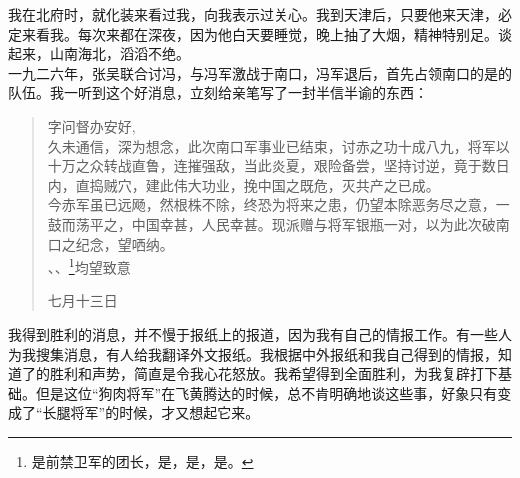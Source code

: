 我在北府时，就化装来看过我，向我表示过关心。我到天津后，只要他来天津，必定来看我。每次来都在深夜，因为他白天要睡觉，晚上抽了大烟，精神特别足。谈起来，山南海北，滔滔不绝。\\

一九二六年，张吴联合讨冯，与冯军激战于南口，冯军退后，首先占领南口的是的队伍。我一听到这个好消息，立刻给亲笔写了一封半信半谕的东西：\\

\begin{quote}
	字问督办安好,\\

久未通信，深为想念，此次南口军事业已结束，讨赤之功十成八九，将军以十万之众转战直鲁，连摧强敌，当此炎夏，艰险备尝，坚持讨逆，竟于数日内，直捣贼穴，建此伟大功业，挽中国之既危，灭共产之已成。\\

今赤军虽已远飏，然根株不除，终恐为将来之患，仍望本除恶务尽之意，一鼓而荡平之，中国幸甚，人民幸甚。现派赠与将军银瓶一对，以为此次破南口之纪念，望哂纳。\\

、、\footnote{是前禁卫军的团长，是，是，是。}均望致意\\

\begin{flushright}
	七月十三日\\
\end{flushright}
\end{quote}

我得到胜利的消息，并不慢于报纸上的报道，因为我有自己的情报工作。有一些人为我搜集消息，有人给我翻译外文报纸。我根据中外报纸和我自己得到的情报，知道了的胜利和声势，简直是令我心花怒放。我希望得到全面胜利，为我复辟打下基础。但是这位“狗肉将军”在飞黄腾达的时候，总不肯明确地谈这些事，好象只有变成了“长腿将军”的时候，才又想起它来。\\

